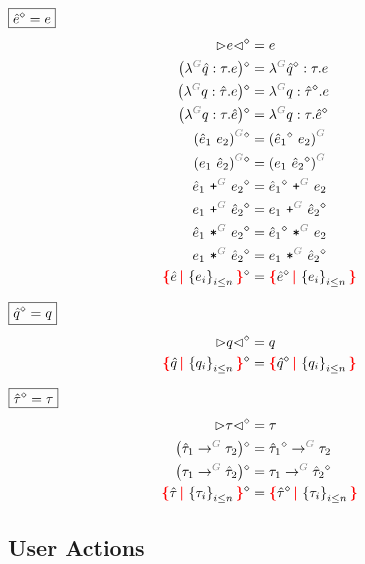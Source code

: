 \noindent $\boxed{\hat{e}\mathclose{}^{\diamond}\mathclose{} = e}$
%
\begin{align*}
  \erase{\cursor{e}} &= e \\
  \erase{\left(\eFun{G}{\Z{q}}{\tau}{e}\right)} &= \eFun{G}{\erase{\Z{q}}}{\tau}{e} \\
  \erase{\left(\eFun{G}{q}{\Z{\tau}}{e}\right)} &= \eFun{G}{q}{\erase{\Z{\tau}}}{e} \\
  \erase{\left(\eFun{G}{q}{\tau}{\Z{e}}\right)} &= \eFun{G}{q}{\tau}{\erase{\Z{e}}} \\
  \erase{\eApp{G}{\Z{e}_1}{e_2}} &= \eApp{G}{\erase{\Z{e}_1}}{e_2} \\
  \erase{\eApp{G}{e_1}{\Z{e}_2}} &= \eApp{G}{e_1}{\erase{\Z{e}_2}} \\
  \erase{\ePlus{G}{\Z{e}_1}{e_2}} &= \ePlus{G}{\erase{\Z{e}_1}}{e_2} \\
  \erase{\ePlus{G}{e_1}{\Z{e}_2}} &= \ePlus{G}{e_1}{\erase{\Z{e}_2}} \\
  \erase{\eTimes{G}{\Z{e}_1}{e_2}} &= \eTimes{G}{\erase{\Z{e}_1}}{e_2} \\
  \erase{\eTimes{G}{e_1}{\Z{e}_2}} &= \eTimes{G}{e_1}{\erase{\Z{e}_2}} \\
  \erase{\conflictHole{\Z{e}, \SetOf{e_i}_{i \leq n}}} &= \conflictHole{\erase{\Z{e}}, \SetOf{e_i}_{i \leq n}}
\end{align*}

\noindent $\boxed{\hat{q}\mathclose{}^{\diamond}\mathclose{} = q}$
%
\begin{align*}
  \erase{\cursor{q}} &= q \\
  \erase{\conflictHole{\Z{q}, \SetOf{q_i}_{i \leq n}}} &= \conflictHole{\erase{\Z{q}}, \SetOf{q_i}_{i \leq n}}
\end{align*}

\noindent $\boxed{\hat{\tau}\mathclose{}^{\diamond}\mathclose{} = \tau}$
%
\begin{align*}
  \erase{\cursor{\tau}} &= \tau \\
  \erase{\left(\tArrow{G}{\Z{\tau}_1}{\tau_2}\right)} &= \tArrow{G}{\erase{\Z{\tau}_1}}{\tau_2} \\
  \erase{\left(\tArrow{G}{\tau_1}{\Z{\tau}_2}\right)} &= \tArrow{G}{\tau_1}{\erase{\Z{\tau}_2}} \\
  \erase{\conflictHole{\Z{\tau}, \SetOf{\tau_i}_{i \leq n}}} &= \conflictHole{\erase{\Z{\tau}}, \SetOf{\tau_i}_{i \leq n}}
\end{align*}


\subsection{User Actions}

